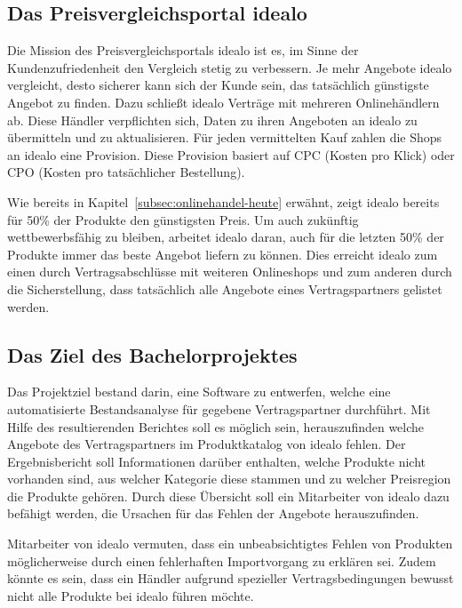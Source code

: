 \subsection{Das Preisvergleichsportal idealo}
\label{subsec:idealo}

Die Mission des Preisvergleichsportals idealo ist es, im Sinne der Kundenzufriedenheit den Vergleich stetig zu
verbessern.
Je mehr Angebote idealo vergleicht, desto sicherer kann sich der Kunde sein, das tatsächlich günstigste Angebot zu
finden.
Dazu schließt idealo Verträge mit mehreren Onlinehändlern ab.
Diese Händler verpflichten sich, Daten zu ihren Angeboten an idealo zu übermitteln und zu aktualisieren.
Für jeden vermittelten Kauf zahlen die Shops an idealo eine Provision.
Diese Provision basiert auf CPC (Kosten pro Klick) oder CPO (Kosten pro tatsächlicher Bestellung).

Wie bereits in Kapitel~\ref{subsec:onlinehandel-heute} erwähnt, zeigt idealo bereits für 50\% der Produkte den
günstigsten Preis.
Um auch zukünftig wettbewerbsfähig zu bleiben, arbeitet idealo daran, auch für die letzten 50\% der Produkte
immer das beste Angebot liefern zu können.
Dies erreicht idealo zum einen durch Vertragsabschlüsse mit weiteren Onlineshops und zum anderen durch die
Sicherstellung, dass tatsächlich alle Angebote eines Vertragspartners gelistet werden.

\subsection{Das Ziel des Bachelorprojektes}
\label{subsec:projektziel}

Das Projektziel bestand darin, eine Software zu entwerfen, welche eine automatisierte Bestandsanalyse für
gegebene Vertragspartner durchführt.
Mit Hilfe des resultierenden Berichtes soll es möglich sein, herauszufinden welche Angebote des Vertragspartners im
Produktkatalog von idealo fehlen.
Der Ergebnisbericht soll Informationen darüber enthalten, welche Produkte nicht vorhanden sind, aus welcher Kategorie
diese stammen und zu welcher Preisregion die Produkte gehören.
Durch diese Übersicht soll ein Mitarbeiter von idealo dazu befähigt werden, die Ursachen für das Fehlen der Angebote
herauszufinden.

Mitarbeiter von idealo vermuten, dass ein unbeabsichtigtes Fehlen von Produkten möglicherweise durch einen fehlerhaften
Importvorgang zu erklären sei.
Zudem könnte es sein, dass ein Händler aufgrund spezieller Vertragsbedingungen bewusst nicht alle
Produkte bei idealo führen möchte.

